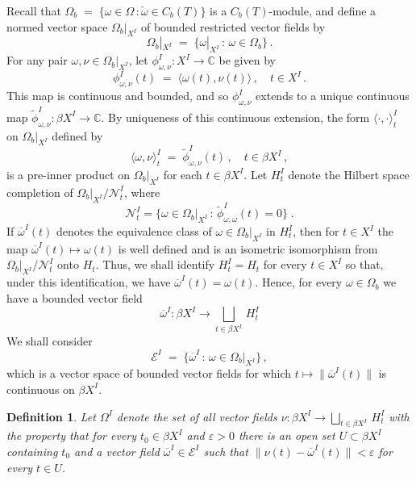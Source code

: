\documentclass{amsart}
\newtheorem{definition}[theorem]{Definition}
\theoremstyle{definition}
\theoremstyle{remark}
\begin{document}
Recall that $\Omega_b\;=\;\{\omega\in\Omega\,: \check{\omega}\in C_b(T)\}$ is a $C_b(T)$-module, and define a normed vector space
$\Omega_b|_{X^I}$ of bounded restricted
vector fields by
 \begin{equation}\label{bounded restriction}
\Omega_b|_{X^I}\;=\;\{\omega|_{X^I}\,:\, \omega\in \Omega_b\}\,.
\end{equation}
For any pair $\omega,\nu\in \Omega_b|_{X^I}$, let
$\phi_{\omega,\nu}^I:X^I\rightarrow \mathbb C$
be given by
\[
\phi_{\omega,\nu}^I(t)\;=\;\langle \omega(t), \nu(t)\rangle\,,\quad t\in X^I\,.
\]
This map is continuous and bounded, and so $\phi_{\omega,\nu}^I$ extends to a unique continuous map
$\tilde\phi_{\omega,\nu}^I:\beta X^I\rightarrow\mathbb C$. By uniqueness of this continuous extension,
the form $\langle\cdot,\cdot\rangle_t^I$ on $\Omega_b|_{X^I}$ defined by
\[
\langle\omega,\nu \rangle_t^I\;=\;\tilde\phi_{\omega,\nu}^I(t)\,,\quad t\in\beta X^I\,,
\]
is a pre-inner product on $\Omega_b|_{X^I}$ for each $t\in\beta X^I$.
Let $H_t^I$ denote the Hilbert space completion of $\Omega_b|_{X^I}/\mathcal N_t^I$, where
\[
\mathcal N_t^I=\{\omega\in \Omega_b|_{X^I}\,:\,\tilde\phi_{\omega,\omega}^I(t)=0\}\;.
\]
If $\overline \omega^I(t)$ denotes the equivalence class of $\omega\in \Omega_b|_{X^I}$ in $H_t^I$, then
for $t\in X^I$ the map $\overline \omega^I(t)\mapsto \omega (t)$ is
well defined and is an isometric isomorphism from $\Omega_b|_{X^I}/\mathcal N_t^I$ onto $H_t$.
Thus, we shall identify $H_t^I=H_t$ for every $t\in X^I$ so that, under this identification, we have $\overline \omega^I(t)=\omega(t)$. Hence, for every $\omega\in\Omega_b$ we have a bounded vector field
\[
\overline\omega^I:\beta X^I \rightarrow \bigsqcup_{t\in \beta X^I}\,H_t^I
\]
We shall consider
\begin{equation}\label{defi ei}
\mathcal E^I\;=\;\{\overline\omega^I\,:\,\omega\in\Omega_b|_{X^I}\}\,,
\end{equation}
which is a vector space of bounded vector fields for which $t\mapsto\|\overline\omega^I(t)\|$ is continuous on $\beta X^I$.

\begin{definition}
Let $\Omega^I$ denote the set of all vector fields $\nu:\beta X^I \rightarrow \bigsqcup_{t\in \beta X^I}\,H_t^I$
with the property that for every $t_0\in\beta X^I$ and $\varepsilon>0$ there is an open set $U\subset\beta X^I$ containing
$t_0$ and a vector field $\overline\omega^I\in \mathcal E^I$ such that
$\|\nu(t)-\overline\omega^I(t)\|<\varepsilon$ for every $t\in U$.
\end{definition}
\end{document}
